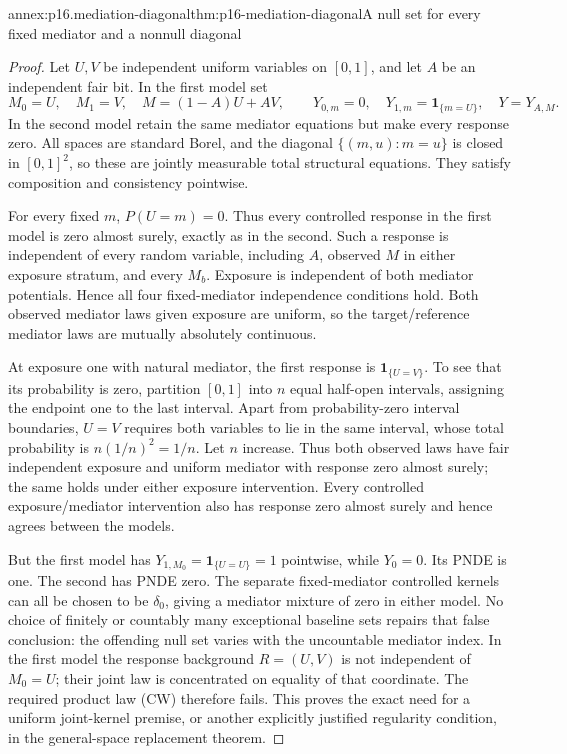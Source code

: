 \begin{annexitem}{annex:p16.mediation-diagonal}{thm:p16-mediation-diagonal}{A null set for every fixed mediator and a nonnull diagonal}
\begin{proof}
Let \(U,V\) be independent uniform variables on \([0,1]\), and
let \(A\) be an independent fair bit. In the first model set
\[
 M_0=U,\quad M_1=V,\quad M=(1-A)U+AV,
 \qquad Y_{0,m}=0,\quad Y_{1,m}=\mathbf1_{\{m=U\}},
 \quad Y=Y_{A,M}.
\]
In the second model retain the same mediator equations but make every
response zero. All spaces are standard Borel, and the diagonal
\(\{(m,u):m=u\}\) is closed in \([0,1]^2\), so these are jointly
measurable total structural equations. They satisfy composition and
consistency pointwise.

For every fixed \(m\), \(P(U=m)=0\). Thus every controlled response
in the first model is zero almost surely, exactly as in the second.
Such a response is independent of every random variable, including
\(A\), observed \(M\) in either exposure stratum, and every \(M_b\).
Exposure is independent of both mediator potentials. Hence all four
fixed-mediator independence conditions hold. Both observed mediator
laws given exposure are uniform, so the target/reference mediator laws
are mutually absolutely continuous.

At exposure one with natural mediator, the first response is
\(\mathbf1_{\{U=V\}}\). To see that its probability is zero, partition
\([0,1]\) into \(n\) equal half-open intervals, assigning the endpoint
one to the last interval. Apart from probability-zero interval boundaries,
\(U=V\) requires both variables to lie in the same interval, whose
total probability is \(n(1/n)^2=1/n\). Let \(n\) increase. Thus both
observed laws have fair independent exposure and uniform mediator with
response zero almost surely; the same holds under either exposure
intervention. Every controlled exposure/mediator intervention also has
response zero almost surely and hence agrees between the models.

But the first model has \(Y_{1,M_0}=\mathbf1_{\{U=U\}}=1\)
pointwise, while \(Y_0=0\). Its PNDE is one. The second has PNDE zero.
The separate fixed-mediator controlled kernels can all be chosen to be
\(\delta_0\), giving a mediator mixture of zero in either model.
No choice of finitely or countably many exceptional baseline sets repairs
that false conclusion: the offending null set varies with the
uncountable mediator index. In the first model the response background
\(R=(U,V)\) is not independent of \(M_0=U\); their joint law is
concentrated on equality of that coordinate. The required product law
(CW) therefore fails. This proves the exact need for a uniform
joint-kernel premise, or another explicitly justified regularity condition,
in the general-space replacement theorem.
\end{proof}
\end{annexitem}


